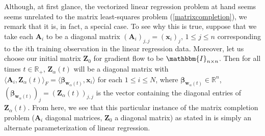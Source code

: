 \documentclass{article}
\begin{document}
Although, at first glance, the vectorized linear regression problem at hand seems seems unrelated to the matrix least-squares problem (\ref{matrixcompletion}), we remark that it is, in fact, a special case. To see why this is true, suppose that we take each $\boldsymbol{A}_i$ to be a diagonal matrix $(\boldsymbol{A}_i)_{j,j} = (\boldsymbol{x}_i)_j$, $1 \leq j \leq n$ corresponding to the $i$th training observation in the linear regression data. Moreover, let us choose our initial matrix $\boldsymbol{Z}_0$ for gradient flow to be $\mathbbm{I}_{n \times n}$. Then for all times $t \in \mathbb{R}_+$, $\boldsymbol{Z}_{\alpha}(t)$ will be a diagonal matrix with $\langle \boldsymbol{A}_i, \boldsymbol{Z}_{\alpha}(t) \rangle_F = \langle \boldsymbol{\beta}_{\boldsymbol{w}_{\alpha}(t)},\boldsymbol{x}_i \rangle$ for each $1 \leq i \leq N$, where $\boldsymbol{\beta}_{\boldsymbol{w}_{\alpha}(t)} \in \mathbb{R}^n$, $(\boldsymbol{\beta}_{\boldsymbol{w}_{\alpha}(t)})_j = (\boldsymbol{Z}_{\alpha}(t))_{j,j}$ is the vector containing the diagonal entries of $\boldsymbol{Z}_{\alpha}(t)$. From here, we see that this particular instance of the matrix completion problem ($\boldsymbol{A}_i$ diagonal matrices, $\boldsymbol{Z}_0$ a diagonal matrix) as stated in \cite{gunasekar2018implicit} is simply an alternate parameterization of linear regression.
\end{document}

